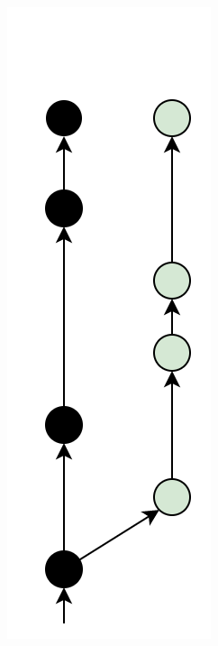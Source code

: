 \documentclass[aspectratio=169]{beamer}
\begin{document}
\begin{frame}
\begin{columns}[c]
		\begin{minipage}[t][6.5cm][t]{\textwidth}
			\begin{figure}
				\centering
				\includegraphics[width=.55\textwidth]{./img/pr-branch.png}
			\end{figure}
		\end{minipage}
		
		
	\end{columns}
\end{frame}
\end{document}
